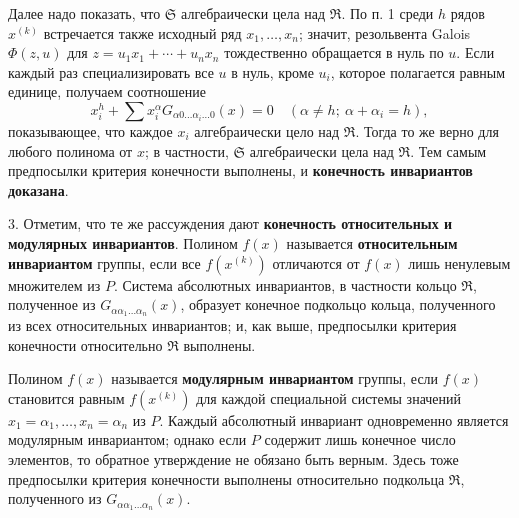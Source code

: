 \documentclass[11pt]{article}
\begin{document}
Далее надо показать, что $\mathfrak S$ алгебраически цела над $\mathfrak R$. По п. 1 среди $h$ рядов $x^{(k)}$ встречается также исходный ряд $x_1,\ldots,x_n$; значит, резольвента Galois $\Phi(z,u)$ для $z=u_1x_1+\cdots+u_nx_n$ тождественно обращается в нуль по $u$. Если каждый раз специализировать все $u$ в нуль, кроме $u_i$, которое полагается равным единице, получаем соотношение
\[
 x_i^h+\sum x_i^\alpha G_{\alpha0\ldots\alpha_i\ldots0}(x)=0
 \quad (\alpha\ne h;\ \alpha+\alpha_i=h),
\]
показывающее, что каждое $x_i$ алгебраически цело над $\mathfrak R$. Тогда то же верно для любого полинома от $x$; в частности, $\mathfrak S$ алгебраически цела над $\mathfrak R$. Тем самым предпосылки критерия конечности выполнены, и \textbf{конечность инвариантов доказана}.

3. Отметим, что те же рассуждения дают \textbf{конечность относительных и модулярных инвариантов}. Полином $f(x)$ называется \textbf{относительным инвариантом} группы, если все $f(x^{(k)})$ отличаются от $f(x)$ лишь ненулевым множителем из $P$. Система абсолютных инвариантов, в частности кольцо $\mathfrak R$, полученное из $G_{\alpha\alpha_1\ldots\alpha_n}(x)$, образует конечное подкольцо кольца, полученного из всех относительных инвариантов; и, как выше, предпосылки критерия конечности относительно $\mathfrak R$ выполнены.

Полином $f(x)$ называется \textbf{модулярным инвариантом} группы, если $f(x)$ становится равным $f(x^{(k)})$ для каждой специальной системы значений $x_1=\alpha_1,\ldots,x_n=\alpha_n$ из $P$. Каждый абсолютный инвариант одновременно является модулярным инвариантом; однако если $P$ содержит лишь конечное число элементов, то обратное утверждение не обязано быть верным. Здесь тоже предпосылки критерия конечности выполнены относительно подкольца $\mathfrak R$, полученного из $G_{\alpha\alpha_1\ldots\alpha_n}(x)$.

\clearpage
\end{document}
